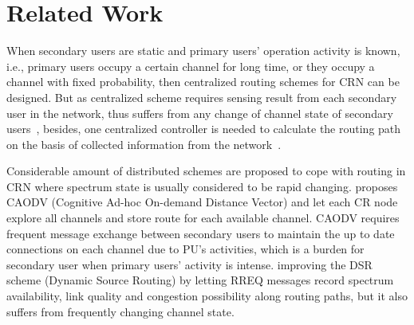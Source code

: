 \section{Related Work}
When secondary users are static and primary users' operation activity is known, i.e., primary users occupy a certain channel for long time, or they occupy a channel with fixed probability, then centralized routing schemes for CRN can be designed\cite{centralized_routing_07dyspan}.
But as centralized scheme requires sensing result from each secondary user in the network, thus suffers from any change of channel state of secondary users~\cite{Abbagnale_Gymkhana10}, besides, one centralized controller is needed to calculate the routing path on the basis of collected information from the network~\cite{centralized_routing_07dyspan, Routing-crn-INFOCOM11}.

Considerable amount of distributed schemes are proposed to cope with routing in CRN where spectrum state is usually considered to be rapid changing.
\cite{caodv-10wd} proposes CAODV (Cognitive Ad-hoc On-demand Distance Vector) and let each CR node explore all channels and store route for each available channel.
CAODV requires frequent message exchange between secondary users to maintain the up to date connections on each channel due to PU's activities, which is a burden for secondary user when primary users' activity is intense. 
\cite{segment-crowncom08} improving the \gls{DSR} scheme (Dynamic Source Routing) by letting RREQ messages record spectrum availability, link quality and congestion possibility along routing paths, but it also suffers from frequently changing channel state.

